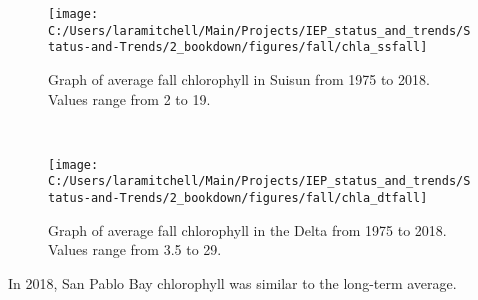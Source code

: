 \documentclass[
]{book}
\begin{document}
\begin{panel-grid}
\begin{columns-nocenter}
\begin{column40}
\end{column40}

\begin{column800}

\begin{expand}

\begin{figure}
\texttt{[image: C:/Users/laramitchell/Main/Projects/IEP\_status\_and\_trends/Status-and-Trends/2\_bookdown/figures/fall/chla\_ssfall]} \caption{Graph of average fall chlorophyll in Suisun from 1975 to 2018. Values range from 2 to 19.}\label{fig:unnamed-chunk-109}
\end{figure}

\end{expand}

\end{column800}

\begin{column40}

~

\end{column40}

\begin{column800}

\begin{expand}

\begin{figure}
\texttt{[image: C:/Users/laramitchell/Main/Projects/IEP\_status\_and\_trends/Status-and-Trends/2\_bookdown/figures/fall/chla\_dtfall]} \caption{Graph of average fall chlorophyll in the Delta from 1975 to 2018. Values range from 3.5 to 29.}\label{fig:unnamed-chunk-110}
\end{figure}

\end{expand}

\end{column800}

\end{columns-nocenter}

\begin{columns-nocenter}

\begin{column800}

In 2018, San Pablo Bay chlorophyll was similar to the long-term average.

\end{column800}

\begin{column40}

~


\end{column40}
\end{columns-nocenter}
\end{panel-grid}
\end{document}
